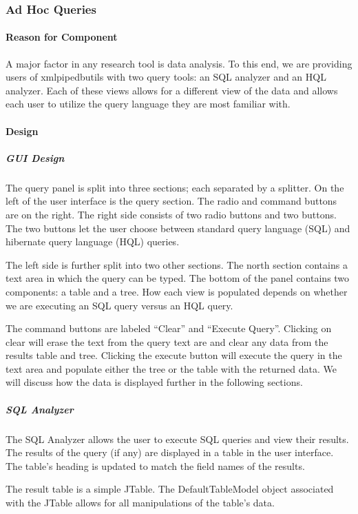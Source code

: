 \subsubsection{Ad Hoc Queries}

\paragraph{Reason for Component}
A major factor in any research tool is data analysis. To this end, we are providing users of xmlpipedbutils with two query tools: an SQL analyzer and an HQL analyzer. Each of these views allows for a different view of the data and allows each user to utilize the query language they are most familiar with.

\paragraph{Design}

\subparagraph{GUI Design}

The query panel is split into three sections; each separated by a splitter. On the left of the user interface is the query section. The radio and command buttons are on the right. The right side consists of two radio buttons and two buttons. The two buttons let the user choose between standard query language (SQL) and hibernate query language (HQL) queries. 

The left side is further split into two other sections. The north section contains a text area in which the query can be typed. The bottom of the panel contains two components: a table and a tree. How each view is populated depends on whether we are executing an SQL query versus an HQL query.

The command buttons are labeled ``Clear'' and ``Execute Query''. Clicking on clear will erase the text from the query text are and clear any data from the results table and tree. Clicking the execute button will execute the query in the text area and populate either the tree or the table with the returned data. We will discuss how the data is displayed further in the following sections.

\subparagraph{SQL Analyzer}

The SQL Analyzer allows the user to execute SQL queries and view their results. The results of the query (if any) are displayed in a table in the user interface. The table's heading is updated to match the field names of the results.

The result table is a simple JTable. The DefaultTableModel object associated with the JTable allows for all manipulations of the table's data.

